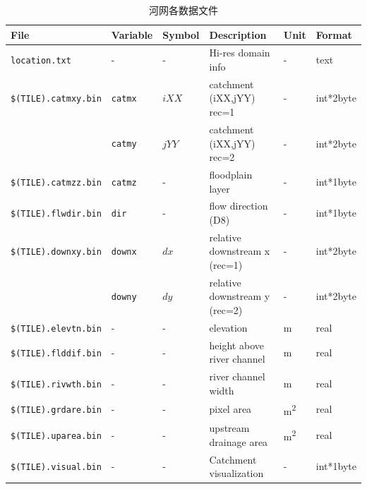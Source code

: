 \begin{table}[htbp]
  \centering
  \caption{河网各数据文件}
  \label{tab:河网各数据文件1}
  \begin{tabular}[h]{p{4cm}p{1.5cm}p{1.5cm}p{4cm}p{1cm}p{2cm}} %
    \toprule
    File                         & Variable       & Symbol & Description                   & Unit       & Format    \\ \midrule
    \texttt{location.txt}        & -              & -      & Hi-res domain info            & -          & text      \\
    \texttt{\$(TILE).catmxy.bin} & \texttt{catmx} & $iXX$  & catchment (iXX,jYY) rec=1     & -          & int*2byte \\
                                 & \texttt{catmy} & $jYY$  & catchment (iXX,jYY) rec=2     & -          & int*2byte \\
    \texttt{\$(TILE).catmzz.bin} & \texttt{catmz} & -      & floodplain layer              & -          & int*1byte \\
    \texttt{\$(TILE).flwdir.bin} & \texttt{dir}   & -      & flow direction (D8)           & -          & int*1byte \\
    \texttt{\$(TILE).downxy.bin} & \texttt{downx} & $dx$   & relative downstream x (rec=1) & -          & int*2byte \\
                                 & \texttt{downy} & $dy$   & relative downstream y (rec=2) & -          & int*2byte \\
    \texttt{\$(TILE).elevtn.bin} & -              & -      & elevation                     & m          & real      \\
    \texttt{\$(TILE).flddif.bin} & -              & -      & height above river channel    & m          & real      \\
    \texttt{\$(TILE).rivwth.bin} & -              & -      & river channel width           & m          & real      \\
    \texttt{\$(TILE).grdare.bin} & -              & -      & pixel area                    & \unit{m^2} & real      \\
    \texttt{\$(TILE).uparea.bin} & -              & -      & upstream drainage area        & \unit{m^2} & real      \\
    \texttt{\$(TILE).visual.bin} & -              & -      & Catchment visualization       & -          & int*1byte \\ \bottomrule
  \end{tabular}
\end{table}


